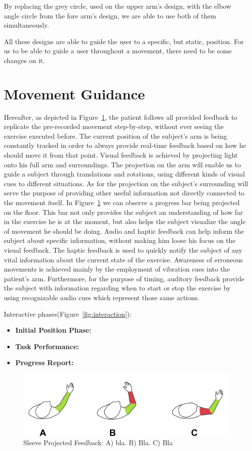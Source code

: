 By replacing the grey circle, used on the upper arm's design, with the elbow angle circle from the fore arm's design, we are able to use both of them simultaneously. 

All these designs are able to guide the user to a specific, but static, position. For us to be able to guide a user throughout a movement, there need to be some changes on it.

\section{Movement Guidance}

Hereafter, as depicted in Figure~\ref{fig:vision}, 
the patient follows all provided feedback to replicate the pre-recorded movement step-by-step, without ever seeing the exercise executed before.
The current position of the subject's arm is being constantly tracked in order to always provide real-time 
feedback based on how he should move it from that point.
Visual feedback is achieved by projecting light onto his full arm and surroundings. The projection on the arm will enable us to 
guide a subject through translations and rotations, using different kinds of visual cues to different situations. As for the projection on the subject's surrounding 
will serve the purpose of providing other useful information not directly connected to the movement itself. 
In Figure~\ref{fig:vision} we can observe a progress bar being projected on the floor. 
This bar not only provides the subject an understanding of how far in the exercise he is at the moment, but also helps the subject visualize the angle of movement he should be doing.
Audio and haptic feedback can help inform the subject about specific information, without making him loose his focus on the visual feedback.
The haptic feedback is used to quickly notify the subject of any vital information about the current state of the exercise. 
Awareness of erroneous movements is achieved mainly by the employment of vibration cues into the patient's arm.
Furthermore, for the purpose of timing, auditory feedback provide the subject with information regarding when to start or stop the exercise by using recognizable audio cues which represent those same actions.

Interactive phases(Figure~\ref{fig:interaction}):
\begin{itemize}
\item {\bf Initial Position Phase:}
\item {\bf Task Performance:}
\item {\bf Progress Report:}
\end{itemize}



\begin{figure}[!b]
    \begin{center}
        \includegraphics[width=\columnwidth]{imgs/visualfeedback.png}
    \end{center}
    \caption{Sleeve Projected Feedback: A) bla. B) Bla. C) Bla}
    \label{fig:vision}
\end{figure}